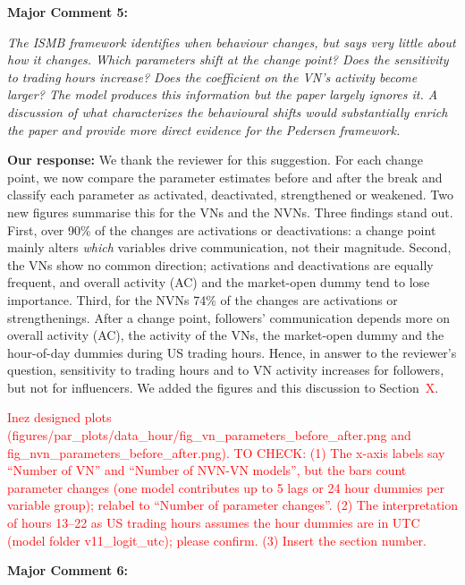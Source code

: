 \documentclass[11pt]{article}
\newcommand{\reviewercomment}[1]{\begin{commentbox}\textit{#1}\end{commentbox}}
\newcommand{\ourresponse}[1]{\textbf{Our response:} #1}
\begin{document}
\textbf{Major Comment 5:}

\reviewercomment{%
	The ISMB framework identifies when behaviour changes, but says very little about how it changes. Which parameters shift at the change point? Does the sensitivity to trading hours increase? Does the coefficient on the VN's activity become larger? The model produces this information but the paper largely ignores it. A discussion of what characterizes the behavioural shifts would substantially enrich the paper and provide more direct evidence for the Pedersen framework. 
}

\ourresponse{
	We thank the reviewer for this suggestion. For each change point, we now compare the parameter estimates before and after the break and classify each parameter as activated, deactivated, strengthened or weakened. Two new figures summarise this for the VNs and the NVNs. Three findings stand out. First, over 90\% of the changes are activations or deactivations: a change point mainly alters \emph{which} variables drive communication, not their magnitude. Second, the VNs show no common direction; activations and deactivations are equally frequent, and overall activity (AC) and the market-open dummy tend to lose importance. Third, for the NVNs 74\% of the changes are activations or strengthenings. After a change point, followers' communication depends more on overall activity (AC), the activity of the VNs, the market-open dummy and the hour-of-day dummies during US trading hours. Hence, in answer to the reviewer's question, sensitivity to trading hours and to VN activity increases for followers, but not for influencers. We added the figures and this discussion to Section~\textcolor{red}{X}.

	\textcolor{red}{Inez designed plots (figures/par\_plots/data\_hour/fig\_vn\_parameters\_before\_after.png and fig\_nvn\_parameters\_before\_after.png). TO CHECK: (1) The x-axis labels say ``Number of VN'' and ``Number of NVN-VN models'', but the bars count parameter changes (one model contributes up to 5 lags or 24 hour dummies per variable group); relabel to ``Number of parameter changes''. (2) The interpretation of hours 13--22 as US trading hours assumes the hour dummies are in UTC (model folder v11\_logit\_utc); please confirm. (3) Insert the section number.}
}

\bigskip

\textbf{Major Comment 6:}
\end{document}
